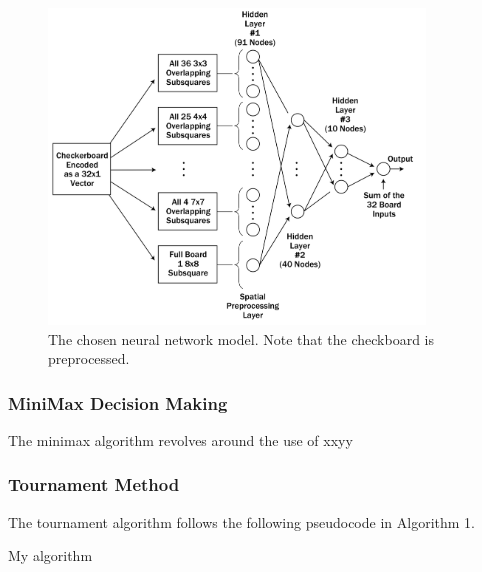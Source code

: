 \documentclass[12pt,a4paper]{article}
\makeatletter
\def\BState{\State\hskip-\ALG@thistlm}
\makeatother
\begin{document}
\begin{figure}[ht!]
    \centering
    \includegraphics[width=100mm]{nnmodel.png}
    \caption{The chosen neural network model. Note that the checkboard is preprocessed. \label{overflow}}
\end{figure}

\subsubsection{MiniMax Decision Making}

The minimax algorithm revolves around the use of xxyy

\subsubsection{Tournament Method}

The tournament algorithm follows the following pseudocode in Algorithm 1.

\begin{algorithm}
    \caption{My algorithm}\label{euclid}
\end{algorithm}
\end{document}
